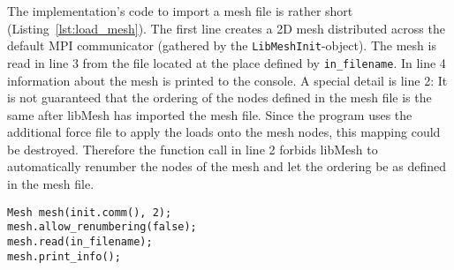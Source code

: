    The implementation's code to import a mesh file is rather short (Listing~\ref{lst:load_mesh}). The first line creates a 2D mesh distributed across the default MPI communicator (gathered by the \texttt{LibMeshInit}-object). The mesh is read in line 3 from the file located at the place defined by \texttt{in\_filename}. In line 4 information about the mesh is printed to the console. A special detail is line 2: It is not guaranteed that the ordering of the nodes defined in the mesh file is the same after libMesh has imported the mesh file. Since the program uses the additional force file to apply the loads onto the mesh nodes, this mapping could be destroyed. Therefore the function call in line 2 forbids libMesh to automatically renumber the nodes of the mesh and let the ordering be as defined in the mesh file.
\begin{lstlisting}[caption=Loading mesh and prepare for use,label=lst:load_mesh,keepspaces=true]
Mesh mesh(init.comm(), 2);
mesh.allow_renumbering(false);
mesh.read(in_filename);	
mesh.print_info();
\end{lstlisting}

